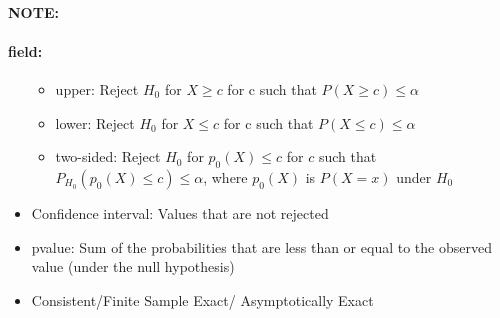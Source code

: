 \documentclass[12pt]{article}
\newenvironment{note}{\paragraph{NOTE:}}{}
\newenvironment{field}{\paragraph{field:}}{}
\begin{document}
\begin{note}
\begin{field}
\begin{itemize}
         \begin{itemize}
          \item upper: Reject $H_0$ for $X \geq c$ for c such that $P(X \geq c)\leq \alpha$
          \item lower: Reject $H_0$ for $X \leq c$ for c such that $P(X \leq c)\leq \alpha$
          \item two-sided: Reject $H_0$ for $p_0(X)\leq c$ for $c$ such that$P_{H_0}(p_0(X) \leq c)\leq \alpha$, where $p_0(X)$ is $P(X = x)$ under $H_0$
         \end{itemize}
   \item Confidence interval: Values that are not rejected
   \item pvalue: Sum of the probabilities that are less than or equal to the observed value (under the null hypothesis)
   \item Consistent/Finite Sample Exact/ Asymptotically Exact
  \end{itemize}
 \end{field}
\end{note}
\end{document}
